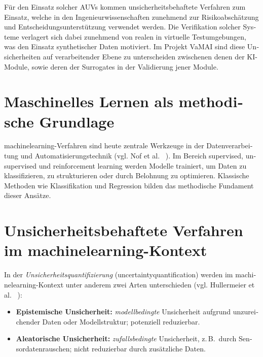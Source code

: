 \begin{otherlanguage}{ngerman}
Für den Einsatz solcher AUVs kommen unsicherheitsbehaftete Verfahren zum Einsatz, welche in den Ingenieurwissenschaften zunehmend zur Risikoabschätzung und Entscheidungsunterstützung verwendet werden. Die Verifikation solcher Systeme verlagert sich dabei zunehmend von realen in virtuelle Testumgebungen, was den Einsatz synthetischer Daten motiviert. Im Projekt VaMAI sind diese Unsicherheiten auf verarbeitender Ebene zu unterscheiden zwischenen denen der KI-Module, sowie deren der Surrogates in der Validierung jener Module.


\section{Maschinelles Lernen als methodische Grundlage}

\gls{machinelearning}-Verfahren sind heute zentrale Werkzeuge in der Datenverarbeitung und Automatisierungstechnik (vgl. Nof et al. ~\parencite{Nof2023}). Im Bereich \glqq supervised\grqq, \glqq unsupervised\grqq{} und \glqq reinforcement learning\grqq{} werden Modelle trainiert, um Daten zu klassifizieren, zu strukturieren oder durch Belohnung zu optimieren. Klassische Methoden wie Klassifikation und Regression bilden das methodische Fundament dieser Ansätze.

\section{Unsicherheitsbehaftete Verfahren im \gls{machinelearning}-Kontext}

In der \textit{Unsicherheitsquantifizierung} (\gls{uncertaintyquantification}) werden im \gls{machinelearning}-Kontext unter anderem zwei Arten unterschieden (vgl. Hullermeier et al. ~\parencite[{S.458, \glqq Sources of uncertainty in supervised learning\grqq{}, \gls{Aleatorische Unsicherheit} Z.23-27, \gls{Epistemische Unsicherheit} Z.23-25}]{Hullermeier2021}):

\begin{itemize}
  \item \textbf{\gls{Epistemische Unsicherheit}:} \textit{modellbedingte} Unsicherheit aufgrund unzureichender Daten oder Modellstruktur; potenziell reduzierbar.
  \item \textbf{\gls{Aleatorische Unsicherheit}:} \textit{zufallsbedingte} Unsicherheit, z.\,B.\ durch Sensordatenrauschen; nicht reduzierbar durch zusätzliche Daten.
\end{itemize}


\end{otherlanguage}
